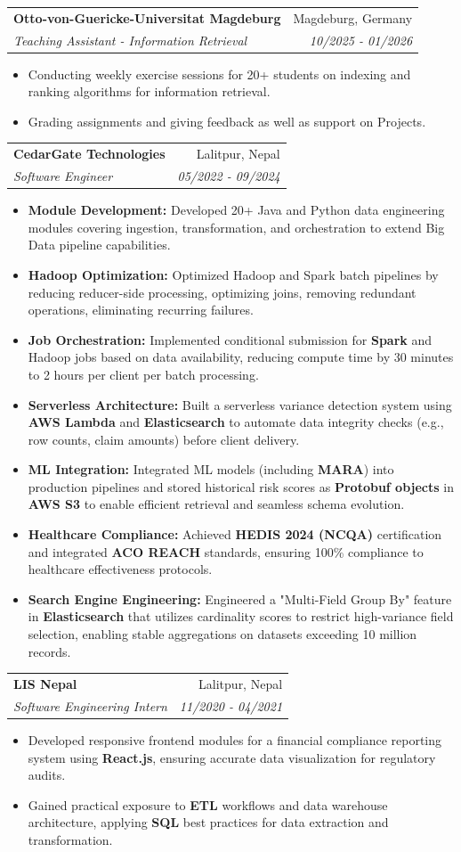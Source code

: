 \documentclass[a4paper,11pt]{article}
\makeatletter
\newcommand{\resumeItem}[1]{
  \item\small{{#1 \vspace{-2pt}}}
}
\newcommand{\resumeSubheading}[4]{
  \vspace{-2pt}\item
    \begin{tabular*}{0.97\textwidth}[t]{l@{\extracolsep{\fill}}r}
      \textbf{#1} & #2 \\
      \textit{\small#3} & \textit{\small #4} \\
    \end{tabular*}\vspace{-7pt}
}
\newcommand{\resumeItemListStart}{\begin{itemize}}
\newcommand{\resumeItemListEnd}{\end{itemize}\vspace{-5pt}}
\makeatother
\begin{document}
    \resumeSubheading
      {Otto-von-Guericke-Universitat Magdeburg}{Magdeburg, Germany}
      {Teaching Assistant - Information Retrieval}{10/2025 - 01/2026}
      \resumeItemListStart
        \resumeItem{Conducting weekly exercise sessions for 20+ students on indexing and ranking algorithms for information retrieval.}
        \resumeItem{Grading assignments and giving feedback as well as support on Projects.}
      \resumeItemListEnd

    \resumeSubheading
      {CedarGate Technologies}{Lalitpur, Nepal}
      {Software Engineer}{05/2022 - 09/2024}
      \resumeItemListStart
        \resumeItem{\textbf{Module Development:} Developed 20+ Java and Python data engineering modules covering ingestion, transformation, and orchestration to extend Big Data pipeline capabilities.}
        \resumeItem{\textbf{Hadoop Optimization:} Optimized Hadoop and Spark batch pipelines by reducing reducer-side processing, optimizing joins, removing redundant operations, eliminating recurring failures.}
        \resumeItem{\textbf{Job Orchestration:} Implemented conditional submission for \textbf{Spark} and Hadoop jobs based on data availability, reducing compute time by 30 minutes to 2 hours per client per batch processing.}
        \resumeItem{\textbf{Serverless Architecture:} Built a serverless variance detection system using \textbf{AWS Lambda} and \textbf{Elasticsearch} to automate data integrity checks (e.g., row counts, claim amounts) before client delivery.}
        \resumeItem{\textbf{ML Integration:} Integrated ML models (including \textbf{MARA}) into production pipelines and stored historical risk scores as \textbf{Protobuf objects} in \textbf{AWS S3} to enable efficient retrieval and seamless schema evolution.}
        \resumeItem{\textbf{Healthcare Compliance:} Achieved \textbf{HEDIS 2024 (NCQA)} certification and integrated \textbf{ACO REACH} standards, ensuring 100\% compliance to healthcare effectiveness protocols.}
        \resumeItem{\textbf{Search Engine Engineering:} Engineered a "Multi-Field Group By" feature in \textbf{Elasticsearch} that utilizes cardinality scores to restrict high-variance field selection, enabling stable aggregations on datasets exceeding 10 million records.}
      \resumeItemListEnd

    \resumeSubheading
      {LIS Nepal}{Lalitpur, Nepal}
      {Software Engineering Intern}{11/2020 - 04/2021}
      \resumeItemListStart
        \resumeItem{Developed responsive frontend modules for a financial compliance reporting system using \textbf{React.js}, ensuring accurate data visualization for regulatory audits.}
        \resumeItem{Gained practical exposure to \textbf{ETL} workflows and data warehouse architecture, applying \textbf{SQL} best practices for data extraction and transformation.}
      \resumeItemListEnd
\end{document}
